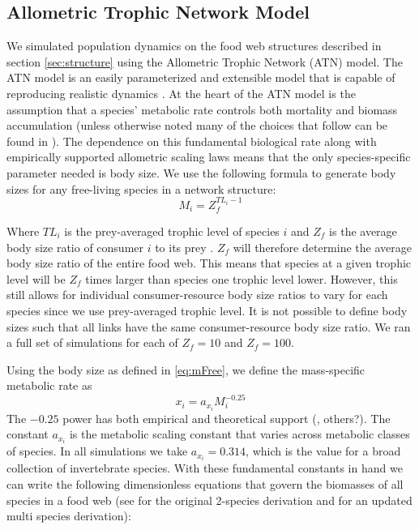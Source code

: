 \documentclass[11pt]{amsart}
\begin{document}
\subsection{Allometric Trophic Network Model}

We simulated population dynamics on the food web structures described in section \ref{sec:structure} using the Allometric Trophic Network (ATN) model.  The ATN model is an easily parameterized and extensible model that is capable of reproducing realistic dynamics \cite{Boit2012}.  At the heart of the ATN model is the assumption that a species' metabolic rate controls both mortality and biomass accumulation (unless otherwise noted many of the choices that follow can be found in \cite{Brose2006}).  The dependence on this fundamental biological rate along with empirically supported allometric scaling laws means that the only species-specific parameter needed is body size.  We use the following formula to generate body sizes for any free-living species in a network structure:
\begin{equation}
M_i= Z_f^{TL_i-1}\label{eq:mFree}
\end{equation}

Where $TL_i$ is the prey-averaged trophic level of species $i$ and $Z_f$ is the average body size ratio of consumer $i$ to its prey \cite{Martinez2004}.  $Z_f$ will therefore determine the average body size ratio of the entire food web.  This means that species at a given trophic level will be $Z_f$ times larger than species one trophic level lower.  However, this still allows for individual consumer-resource body size ratios to vary for each species since we use prey-averaged trophic level.  It is not possible to define body sizes such that all links have the same consumer-resource body size ratio.  We ran a full set of simulations for each of $Z_f = 10$ and $Z_f = 100$.  

Using the body size as defined in \eqref{eq:mFree}, we define the mass-specific metabolic rate as
\begin{equation}
x_i = a_{x_i} M_i^{-0.25}\label{eq:x}
\end{equation}
The $-0.25$ power has both empirical and theoretical support (\cite{Brown2004}, others?).  The constant $a_{x_i}$ is the metabolic scaling constant that varies across metabolic classes of species.  In all simulations we take $a_{x_i}=0.314$, which is the value for a broad collection of invertebrate species.  With these fundamental constants in hand we can write the following dimensionless equations that govern the biomasses of all species in a food web (see \cite{Yodzis1992} for the original 2-species derivation and \cite{Willams2007} for an updated multi species derivation): 
\end{document}
